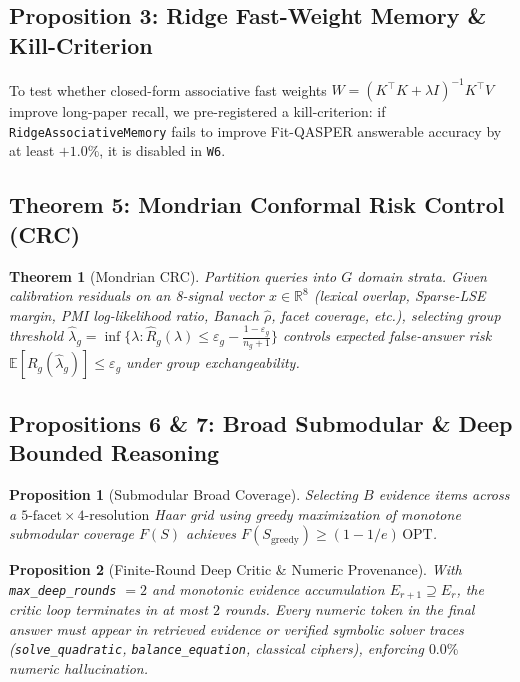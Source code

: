 \documentclass[conference]{IEEEtran}
\newtheorem{proposition}{Proposition}
\newtheorem{theorem}{Theorem}
\begin{document}
\subsection{Proposition 3: Ridge Fast-Weight Memory \& Kill-Criterion}
To test whether closed-form associative fast weights $W = (K^\top K + \lambda I)^{-1} K^\top V$ improve long-paper recall, we pre-registered a kill-criterion: if \texttt{RidgeAssociativeMemory} fails to improve Fit-QASPER answerable accuracy by at least $+1.0\%$, it is disabled in \texttt{W6}.

\subsection{Theorem 5: Mondrian Conformal Risk Control (CRC)}
\begin{theorem}[Mondrian CRC]
Partition queries into $G$ domain strata. Given calibration residuals on an 8-signal vector $x \in \mathbb{R}^8$ (lexical overlap, Sparse-LSE margin, PMI log-likelihood ratio, Banach $\hat{\rho}$, facet coverage, etc.), selecting group threshold $\hat{\lambda}_g = \inf\{ \lambda : \hat{R}_g(\lambda) \le \varepsilon_g - \frac{1-\varepsilon_g}{n_g + 1} \}$ controls expected false-answer risk $\mathbb{E}[R_g(\hat{\lambda}_g)] \le \varepsilon_g$ under group exchangeability.
\end{theorem}

\subsection{Propositions 6 \& 7: Broad Submodular \& Deep Bounded Reasoning}
\begin{proposition}[Submodular Broad Coverage]
Selecting $B$ evidence items across a $5\text{-facet} \times 4\text{-resolution}$ Haar grid using greedy maximization of monotone submodular coverage $F(S)$ achieves $F(S_{\text{greedy}}) \ge (1 - 1/e)\,\text{OPT}$.
\end{proposition}
\begin{proposition}[Finite-Round Deep Critic & Numeric Provenance]
With \texttt{max\_deep\_rounds} $= 2$ and monotonic evidence accumulation $E_{r+1} \supseteq E_r$, the critic loop terminates in at most $2$ rounds. Every numeric token in the final answer must appear in retrieved evidence or verified symbolic solver traces (\texttt{solve\_quadratic}, \texttt{balance\_equation}, classical ciphers), enforcing $0.0\%$ numeric hallucination.
\end{proposition}
\end{document}
